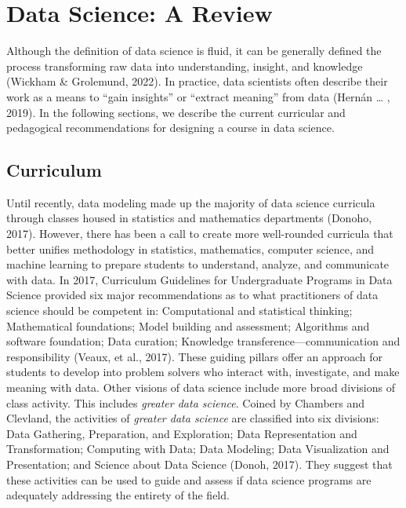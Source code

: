 \documentclass[
  12pt]{article}
\begin{document}
\hypertarget{sec-review}{%
\section{Data Science: A Review}\label{sec-review}}

Although the definition of data science is fluid, it can be generally
defined the process transforming raw data into understanding, insight,
and knowledge (Wickham \& Grolemund, 2022). In practice, data scientists
often describe their work as a means to ``gain insights'' or ``extract
meaning'' from data (Hernán \ldots{} , 2019). In the following sections,
we describe the current curricular and pedagogical recommendations for
designing a course in data science.

\hypertarget{sec-curr}{%
\subsection{Curriculum}\label{sec-curr}}

Until recently, data modeling made up the majority of data science
curricula through classes housed in statistics and mathematics
departments (Donoho, 2017). However, there has been a call to create
more well-rounded curricula that better unifies methodology in
statistics, mathematics, computer science, and machine learning to
prepare students to understand, analyze, and communicate with data. In
2017, Curriculum Guidelines for Undergraduate Programs in Data Science
provided six major recommendations as to what practitioners of data
science should be competent in: Computational and statistical thinking;
Mathematical foundations; Model building and assessment; Algorithms and
software foundation; Data curation; Knowledge
transference---communication and responsibility (Veaux, et al., 2017).
These guiding pillars offer an approach for students to develop into
problem solvers who interact with, investigate, and make meaning with
data. Other visions of data science include more broad divisions of
class activity. This includes \emph{greater data science}. Coined by
Chambers and Clevland, the activities of \emph{greater data science} are
classified into six divisions: Data Gathering, Preparation, and
Exploration; Data Representation and Transformation; Computing with
Data; Data Modeling; Data Visualization and Presentation; and Science
about Data Science (Donoh, 2017). They suggest that these activities can
be used to guide and assess if data science programs are adequately
addressing the entirety of the field.
\end{document}
